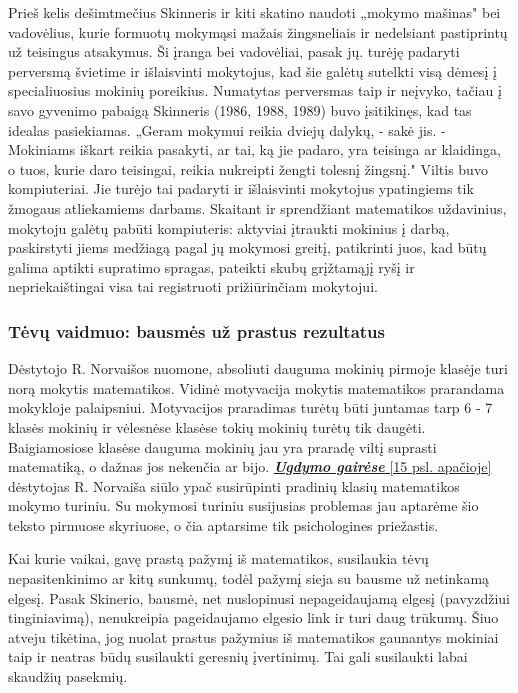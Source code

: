\documentclass{article}
\begin{document}
Prieš kelis dešimtmečius Skinneris ir kiti skatino naudoti „mokymo mašinas" bei vadovėlius, kurie formuotų mokymąsi mažais žingsneliais ir nedelsiant pastiprintų už teisingus atsakymus. Ši įranga bei vadovėliai, pasak jų.
turėję padaryti perversmą švietime ir išlaisvinti mokytojus, kad šie galėtų sutelkti
visą dėmesį į specialiuosius mokinių poreikius. Numatytas perversmas taip ir neįvyko, tačiau į savo gyvenimo pabaigą Skinneris (1986, 1988, 1989) buvo įsitikinęs, kad tas idealas pasiekiamas. „Geram
mokymui reikia dviejų dalykų, - sakė jis. - Mokiniams iškart reikia pasakyti,
ar tai, ką jie padaro, yra teisinga ar klaidinga, o tuos, kurie daro teisingai, reikia nukreipti žengti tolesnį žingsnį." Viltis buvo kompiuteriai. Jie turėjo tai padaryti ir išlaisvinti mokytojus ypatingiems tik žmogaus atliekamiems darbams. Skaitant ir sprendžiant matematikos uždavinius, mokytoju galėtų pabūti kompiuteris: aktyviai įtraukti mokinius į darbą, paskirstyti jiems medžiagą pagal jų mokymosi greitį, patikrinti juos, kad būtų galima aptikti supratimo spragas, pateikti
skubų grįžtamąjį ryšį ir nepriekaištingai visa tai registruoti prižiūrinčiam mokytojui.

\subsubsection{Tėvų vaidmuo: bausmės už prastus rezultatus}

Dėstytojo R. Norvaišos nuomone, absoliuti dauguma mokinių pirmoje klasėje turi norą mokytis matematikos. Vidinė motyvacija mokytis matematikos prarandama mokykloje palaipsniui. Motyvacijos praradimas turėtų būti juntamas tarp 6 - 7 klasės mokinių ir vėlesnėse klasėse tokių mokinių turėtų tik daugėti. Baigiamosiose klasėse dauguma mokinių jau yra praradę viltį suprasti matematiką, o dažnas jos nekenčia ar bijo. \href{https://www.upc.smm.lt/ugdymas/dokumentai/svarstomi/matemat/Matematinio\_ugdymo\_gaires.pdf}{\textbf{\textit{Ugdymo gairėse}} [15 psl. apačioje]} dėstytojas R. Norvaiša siūlo ypač susirūpinti pradinių klasių matematikos mokymo turiniu. Su mokymosi turiniu susijusias problemas jau aptarėme šio teksto pirmuose skyriuose, o čia aptarsime tik psichologines priežastis.

Kai kurie vaikai, gavę prastą pažymį iš matematikos, susilaukia tėvų nepasitenkinimo ar kitų sunkumų, todėl pažymį sieja su bausme už netinkamą elgesį. Pasak Skinerio, bausmė, net nuslopinusi nepageidaujamą elgesį (pavyzdžiui tinginiavimą), nenukreipia pageidaujamo elgesio link ir turi daug trūkumų. Šiuo atveju tikėtina, jog nuolat prastus pažymius iš matematikos gaunantys mokiniai taip ir neatras būdų susilaukti geresnių įvertinimų. Tai gali susilaukti labai skaudžių pasekmių.
\end{document}
